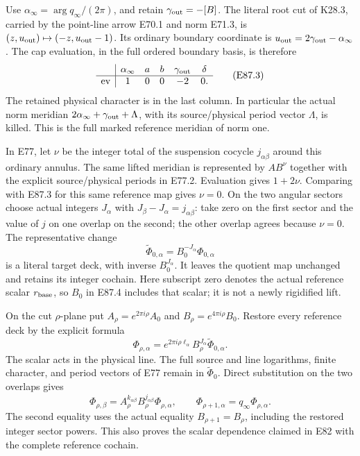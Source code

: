Use \(\alpha_\infty=\arg q_\infty/(2\pi)\), and retain
\(\gamma_{\rm out}=-[B]\). The literal root cut of K28.3,
carried by the point-line arrow E70.1 and norm E71.3, is
\((z,u_{\rm out})\mapsto(-z,u_{\rm out}-1)\).
Its ordinary boundary coordinate is
\(u_{\rm out}=2\gamma_{\rm out}-\alpha_\infty\).
The cap evaluation, in the full ordered boundary basis,
is therefore
\[
 \begin{array}{c|ccccc}
       &\alpha_\infty&a&b&\gamma_{\rm out}&\delta\\ \hline
 \operatorname{ev}&1&0&0&-2&0 .
 \end{array}                                      \tag{E87.3}
\]
The retained physical character is in the last column.
In particular the actual norm meridian
\(2\alpha_\infty+\gamma_{\rm out}+\Lambda\), with its
source/physical period vector \(\Lambda\), is killed.
This is the full marked reference meridian of norm one.

In E77, let \(\nu\) be the integer total of the suspension
cocycle \(j_{\alpha\beta}\) around this ordinary annulus.
The same lifted meridian is represented by
\(AB^\nu\) together with the explicit source/physical
periods in E77.2. Evaluation gives \(1+2\nu\).
Comparing with E87.3 for this same reference map gives
\(\nu=0\). On the two angular sectors choose actual
integers \(J_\alpha\) with
\(J_\beta-J_\alpha=j_{\alpha\beta}\): take zero on the
first sector and the value of \(j\) on one overlap on
the second; the other overlap agrees because \(\nu=0\).
The representative change
\[
 \widetilde\Phi_{0,\alpha}=B_0^{-J_\alpha}\Phi_{0,\alpha}
 \tag{E87.4}
\]
is a literal target deck, with inverse \(B_0^{J_\alpha}\).
It leaves the quotient map unchanged and retains its
integer cochain. Here subscript zero denotes the actual
reference scalar \(r_{\rm base}\), so \(B_0\) in E87.4
includes that scalar; it is not a newly rigidified lift.

On the cut \(\rho\)-plane put
\(A_\rho=e^{2\pi i\rho}A_0\) and
\(B_\rho=e^{4\pi i\rho}B_0\). Restore every reference
deck by the explicit formula
\[
 \Phi_{\rho,\alpha}
 =e^{2\pi i\rho\ell_\alpha}
       B_\rho^{J_\alpha}\widetilde\Phi_{0,\alpha}.
 \tag{E87.5}
\]
The scalar acts in the physical line. The full source
and line logarithms, finite character, and period vectors
of E77 remain in \(\widetilde\Phi_0\). Direct substitution
on the two overlaps gives
\[
 \Phi_{\rho,\beta}
  =A_\rho^{k_{\alpha\beta}}
       B_\rho^{j_{\alpha\beta}}\Phi_{\rho,\alpha},
 \qquad
 \Phi_{\rho+1,\alpha}=q_\infty\Phi_{\rho,\alpha}.
 \tag{E87.6}
\]
The second equality uses the actual equality
\(B_{\rho+1}=B_\rho\), including the restored integer
sector powers. This also proves the scalar dependence
claimed in E82 with the complete reference cochain.

